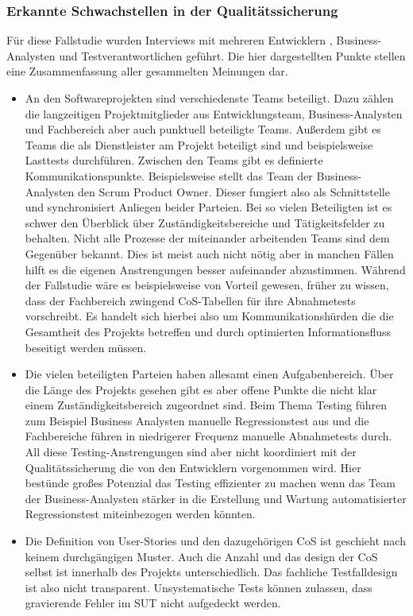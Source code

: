 \subsubsection{Erkannte Schwachstellen in der Qualitätssicherung}
\label{sec:schwachstellen_raiffeisen}
Für diese Fallstudie wurden Interviews mit mehreren Entwicklern , Business-Analysten und Testverantwortlichen geführt. Die hier dargestellten Punkte stellen eine Zusammenfassung aller gesammelten Meinungen dar.\\
\begin{itemize}
\item An den Softwareprojekten sind verschiedenste Teams beteiligt. Dazu zählen die langzeitigen Projektmitglieder aus Entwicklungsteam, Business-Analysten und Fachbereich aber auch punktuell beteiligte Teams. Außerdem gibt es Teams die als Dienstleister am Projekt beteiligt sind und beispielsweise Lasttests durchführen. Zwischen den Teams gibt es definierte Kommunikationspunkte. Beispielsweise stellt das Team der Business-Analysten den Scrum Product Owner. Dieser fungiert also als Schnittstelle und synchronisiert Anliegen beider Parteien. Bei so vielen Beteiligten ist es schwer den Überblick über Zuständigkeitsbereiche und Tätigkeitsfelder zu behalten. Nicht alle Prozesse der miteinander arbeitenden Teams sind dem Gegenüber bekannt. Dies ist meist auch nicht nötig aber in manchen Fällen hilft es die eigenen Anstrengungen besser aufeinander abzustimmen. Während der Fallstudie wäre es beispielsweise von Vorteil gewesen, früher zu wissen, dass der Fachbereich zwingend CoS-Tabellen für ihre Abnahmetests vorschreibt. Es handelt sich hierbei also um Kommunikationshürden die die Gesamtheit des Projekts betreffen und durch optimierten Informationsfluss beseitigt werden müssen.
\item Die vielen beteiligten Parteien haben allesamt einen Aufgabenbereich. Über die Länge des Projekts gesehen gibt es aber offene Punkte die nicht klar einem Zuständigkeitsbereich zugeordnet sind. Beim Thema Testing führen zum Beispiel Business Analysten manuelle Regressionstest aus und die Fachbereiche führen in niedrigerer Frequenz manuelle Abnahmetests durch. All diese Testing-Anstrengungen sind aber nicht koordiniert mit der Qualitätssicherung die von den Entwicklern vorgenommen wird. Hier bestünde großes Potenzial das Testing effizienter zu machen wenn das Team der Business-Analysten stärker in die Erstellung und Wartung automatisierter Regressionstest miteinbezogen werden könnten.
\item Die Definition von User-Stories und den dazugehörigen CoS ist geschieht nach keinem durchgängigen Muster. Auch die Anzahl und das design der CoS selbst ist innerhalb des Projekts unterschiedlich. Das fachliche Testfalldesign ist also nicht transparent. Unsystematische Tests können zulassen, dass gravierende Fehler im SUT nicht aufgedeckt werden.
\end{itemize}

